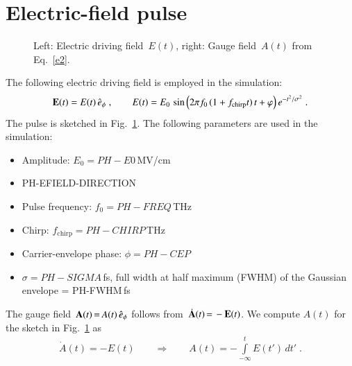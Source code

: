 \documentclass[11pt, a4paper]{scrartcl}
\newlength\figureheight
\newlength\figurewidth
\begin{document}
\section{Electric-field pulse}
\begin{figure}[b!]
\centering
\setlength\figureheight{7.5cm} 
\setlength\figurewidth{7.5cm}
\hfill
\caption{Left: Electric driving field~$E(t)$, right: Gauge field~$A(t)$ from Eq.~\eqref{e2}.}
    \label{fig:Efield}
\end{figure}
\iftrue
The following electric driving field is employed in the simulation:
\begin{align}
    \mathbf{E}(t)  = E(t)\,\hat{e}_\phi
    \;,\hspace{2em}
    E(t) = E_0\,    \sin\Big(2\pi f_0\,(1+f_\text{chirp} t)\,t + \varphi\Big)\, e^{-t^2/\sigma^2}\;.
    \label{e1}
\end{align}
The pulse is sketched in Fig.~\ref{fig:Efield}. 
%
The following parameters are used in the simulation:
\begin{itemize}
    \item Amplitude: $E_0 = PH-E0$\,MV/cm
    \item PH-EFIELD-DIRECTION
    \item Pulse frequency: $f_0 = PH-FREQ$\,THz
    \item Chirp: $f_\text{chirp} = PH-CHIRP$\,THz
    \item Carrier-envelope phase: $\phi = PH-CEP$
    \item $\sigma = PH-SIGMA$\,fs, full width at half maximum (FWHM) of the Gaussian envelope = PH-FWHM\,fs
\end{itemize}
\else 
A user-defined pulse is used. 
%
It is sketched in Fig.~\ref{fig:Efield}. 
\fi
The gauge field~$\mathbf{A}(t)\,{=}\, A(t)\,\hat{e}_\phi$ follows from~$\dot{\mathbf{A}}(t)\,{=}\, -\mathbf{E}(t)$. We compute $A(t)$ for the sketch in Fig.~\ref{fig:Efield} as
\begin{align}
    \dot A(t) = -E(t) \hspace{2em}\Rightarrow\hspace{2em}
    A(t) = -\int\limits_{-\infty}^t E(t')\,dt'\;. \label{e2}
\end{align}
\end{document}
